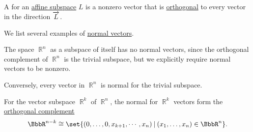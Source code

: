 \begin{definition}\label{def:normal_vector}\mimprovised
  A  for an \hyperref[def:affine_subspace]{affine subspace} \( L \) is a nonzero vector that is \hyperref[def:orthogonality]{orthogonal} to every vector in the direction \( \overrightarrow{L} \).
\end{definition}

\begin{example}\label{ex:def:normal_vector}
  We list several examples of \hyperref[def:normal_vector]{normal vectors}.

  \begin{thmenum}
     The space \( \BbbR^n \) as a subspace of itself has no normal vectors, since the orthogonal complement of \( \BbbR^n \) is the trivial subspace, but we explicitly require normal vectors to be nonzero.

     Conversely, every vector in \( \BbbR^n \) is normal for the trivial subspace.

     For the vector subspace \( \BbbR^k \) of \( \BbbR^n \), the normal for \( \BbbR^k \) vectors form the \hyperref[def:orthogonal_complement]{orthogonal complement}
    \begin{equation*}
      \BbbR^{n-k} \cong \set{ (0, \ldots, 0, x_{k+1}, \cdots, x_n) \given (x_1, \ldots, x_n) \in \BbbR^n }.
    \end{equation*}
  \end{thmenum}
\end{example}

